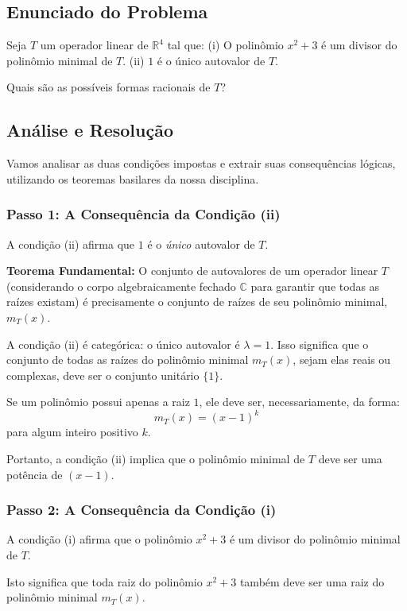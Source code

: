 \subsection*{Enunciado do Problema}

Seja $T$ um operador linear de $\mathbb{R}^4$ tal que:  
(i) O polinômio $x^2 + 3$ é um divisor do polinômio minimal de $T$.  
(ii) $1$ é o único autovalor de $T$.  

Quais são as possíveis formas racionais de $T$?

\subsection*{Análise e Resolução}

Vamos analisar as duas condições impostas e extrair suas consequências lógicas, utilizando os teoremas basilares da nossa disciplina.

\subsubsection*{Passo 1: A Consequência da Condição (ii)}

A condição (ii) afirma que $1$ é o \textit{único} autovalor de $T$.

\textbf{Teorema Fundamental:} O conjunto de autovalores de um operador linear $T$ (considerando o corpo algebraicamente fechado $\mathbb{C}$ para garantir que todas as raízes existam) é precisamente o conjunto de raízes de seu polinômio minimal, $m_T(x)$.

A condição (ii) é categórica: o único autovalor é $\lambda = 1$. Isso significa que o conjunto de todas as raízes do polinômio minimal $m_T(x)$, sejam elas reais ou complexas, deve ser o conjunto unitário $\{1\}$.

Se um polinômio possui apenas a raiz $1$, ele deve ser, necessariamente, da forma:
\[
m_T(x) = (x - 1)^k
\]
para algum inteiro positivo $k$.

Portanto, a condição (ii) implica que o polinômio minimal de $T$ deve ser uma potência de $(x - 1)$.

\subsubsection*{Passo 2: A Consequência da Condição (i)}

A condição (i) afirma que o polinômio $x^2 + 3$ é um divisor do polinômio minimal de $T$.

Isto significa que toda raiz do polinômio $x^2 + 3$ também deve ser uma raiz do polinômio minimal $m_T(x)$.

